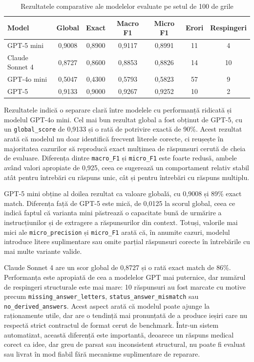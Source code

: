 \documentclass[12pt, a4paper, oneside, romanian]{teza-upb}
\begin{document}
\begin{table}[H]
\centering
\caption{Rezultatele comparative ale modelelor evaluate pe setul de 100 de grile}
\label{tab:rezultate_benchmark_llm}
\small
\setlength{\tabcolsep}{4pt}
\begin{tabular}{lcccccc}
\toprule
\textbf{Model} & \textbf{Global} & \textbf{Exact} & \textbf{Macro F1} & \textbf{Micro F1} & \textbf{Erori} & \textbf{Respingeri} \\
\midrule
GPT-5 mini & 0,9008 & 0,8900 & 0,9117 & 0,8991 & 11 & 4 \\
Claude Sonnet 4 & 0,8727 & 0,8600 & 0,8853 & 0,8826 & 14 & 10 \\
GPT-4o mini & 0,5047 & 0,4300 & 0,5793 & 0,5823 & 57 & 9 \\
GPT-5 & 0,9133 & 0,9000 & 0,9267 & 0,9252 & 10 & 2 \\
\bottomrule
\end{tabular}
\end{table}

Rezultatele indică o separare clară între modelele cu performanță ridicată și modelul GPT-4o mini. Cel mai bun rezultat global a fost obținut de GPT-5, cu un \texttt{global\_score} de 0,9133 și o rată de potrivire exactă de 90\%. Acest rezultat arată că modelul nu doar identifică frecvent literele corecte, ci reușește în majoritatea cazurilor să reproducă exact mulțimea de răspunsuri cerută de cheia de evaluare. Diferența dintre \texttt{macro\_F1} și \texttt{micro\_F1} este foarte redusă, ambele având valori apropiate de 0,925, ceea ce sugerează un comportament relativ stabil atât pentru întrebări cu răspuns unic, cât și pentru întrebări cu răspuns multiplu.

GPT-5 mini obține al doilea rezultat ca valoare globală, cu 0,9008 și 89\% exact match. Diferența față de GPT-5 este mică, de 0,0125 la scorul global, ceea ce indică faptul că varianta mini păstrează o capacitate bună de urmărire a instrucțiunilor și de extragere a răspunsurilor din context. Totuși, valorile mai mici ale \texttt{micro\_precision} și \texttt{micro\_F1} arată că, în anumite cazuri, modelul introduce litere suplimentare sau omite parțial răspunsuri corecte în întrebările cu mai multe variante valide.

Claude Sonnet 4 are un scor global de 0,8727 și o rată exact match de 86\%. Performanța este apropiată de cea a modelelor GPT mai puternice, dar numărul de respingeri structurale este mai mare: 10 răspunsuri au fost marcate cu motive precum \texttt{missing\_answer\_letters}, \texttt{status\_answer\_mismatch} sau \texttt{no\_derived\_answers}. Acest aspect arată că modelul poate ajunge la raționamente utile, dar are o tendință mai pronunțată de a produce ieșiri care nu respectă strict contractul de format cerut de benchmark. Într-un sistem automatizat, această diferență este importantă, deoarece un răspuns medical corect ca idee, dar greu de parsat sau inconsistent structural, nu poate fi evaluat sau livrat în mod fiabil fără mecanisme suplimentare de reparare.
\end{document}
